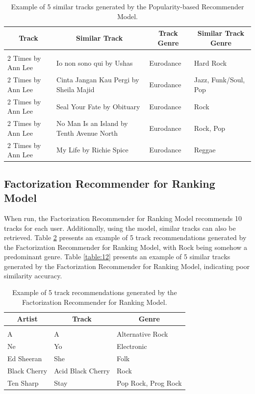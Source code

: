 \documentclass{article} %
\begin{document}
\begin{table}[!htbp]
\caption{Example of 5 similar tracks generated by the Popularity-based Recommender Model.}
\label{table:10}
\begin{center}
\begin{tabular}{p{2.8cm} p{4cm} p{1.5cm} p{3cm}}
\multicolumn{1}{c}{\bf Track} & \multicolumn{1}{c}{\bf Similar Track} & \multicolumn{1}{c}{\bf Track Genre} & \multicolumn{1}{c}{\bf Similar Track Genre}
\\ \hline \\
2 Times by Ann Lee & Io non sono qui by Ushas & Eurodance & Hard Rock\\
2 Times by Ann Lee & Cinta Jangan Kau Pergi by Sheila Majid & Eurodance & Jazz, Funk/Soul, Pop\\
2 Times by Ann Lee & Seal Your Fate by Obituary & Eurodance & Rock\\
2 Times by Ann Lee & No Man Is an Island by Tenth Avenue North & Eurodance & Rock, Pop\\
2 Times by Ann Lee & My Life by Richie Spice & Eurodance & Reggae\\
\end{tabular}
\end{center}
\end{table}

\subsection{Factorization Recommender for Ranking Model}

When run, the Factorization Recommender for Ranking Model recommends 10 tracks for each user. Additionally, using the model, similar tracks can also be retrieved. Table \ref{table:11} presents an example of 5 track recommendations generated by the Factorization Recommender for Ranking Model, with Rock being somehow a predominant genre. Table \ref{table:12} presents an example of 5 similar tracks generated by the Factorization Recommender for Ranking Model, indicating poor similarity accuracy.

\begin{table}[!htbp]
\caption{Example of 5 track recommendations generated by the Factorization Recommender for Ranking Model.}
\label{table:11}
\begin{center}
\begin{tabular}{l l l}
\multicolumn{1}{c}{\bf Artist} & \multicolumn{1}{c}{\bf Track} & \multicolumn{1}{c}{\bf Genre}
\\ \hline \\
A            & A                 & Alternative Rock\\
Ne           & Yo                & Electronic\\
Ed Sheeran   & She               & Folk\\
Black Cherry & Acid Black Cherry & Rock\\
Ten Sharp    & Stay              & Pop Rock, Prog Rock\\
\end{tabular}
\end{center}
\end{table}
\end{document}
